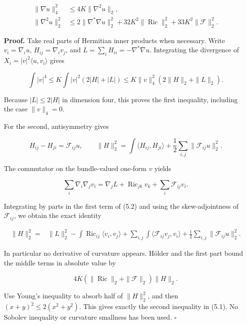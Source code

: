 \documentclass[
  11pt,
]{article}
\begin{document}
\[
 \begin{split}
 \|\nabla u\|_4^2&\le4K\|\nabla^2u\|_2,\\
 \|\nabla^2u\|_2^2
 &\le2\|\nabla^*\nabla u\|_2^2
       +32K^2\|\operatorname{Ric}\|_2^2
       +33K^2\|\mathscr F\|_2^2.
 \end{split}                                              \tag{5.1}
\]

\textbf{Proof.} Take real parts of Hermitian inner products when
necessary. Write \(v_i=\nabla_i u\), \(H_{ij}=\nabla_i v_j\), and
\(L=\sum_iH_{ii}=-\nabla^*\nabla u\). Integrating the divergence of
\(X_i=|v|^2\langle u,v_i\rangle\) gives

\[
 \int|v|^4
 \le K\int |v|^2(2|H|+|L|)
 \le K\|v\|_4^2(2\|H\|_2+\|L\|_2).
\]

Because \(|L|\le2|H|\) in dimension four, this proves the first
inequality, including the case \(\|v\|_4=0\).

For the second, antisymmetry gives

\[
 H_{ij}-H_{ji}=\mathscr F_{ij}u,\qquad
 \|H\|_2^2=\int\langle H_{ij},H_{ji}\rangle
                         +\frac12\sum_{i,j}\|\mathscr F_{ij}u\|_2^2.
 \tag{5.2}
\]

The commutator on the bundle-valued one-form \(v\) yields

\[
 \sum_i\nabla_i\nabla_jv_i
     =\nabla_jL+\operatorname{Ric}_{jk}v_k
                                      +\sum_i\mathscr F_{ij}v_i.
\]

Integrating by parts in the first term of (5.2) and using the
skew-adjointness of \(\mathscr F_{ij}\), we obtain the exact identity

\[
 \begin{split}
 \|H\|_2^2={}&\|L\|_2^2
  -\int\operatorname{Ric}_{ij}\langle v_i,v_j\rangle
  +\sum_{i,j}\int\langle\mathscr F_{ij}v_j,v_i\rangle
  +\frac12\sum_{i,j}\|\mathscr F_{ij}u\|_2^2.
 \end{split}                                              \tag{5.3}
\]

In particular no derivative of curvature appears. Hölder and the first
part bound the middle terms in absolute value by

\[
   4K(\|\operatorname{Ric}\|_2+\|\mathscr F\|_2)\|H\|_2.
\]

Use Young's inequality to absorb half of \(\|H\|_2^2\), and then
\((x+y)^2\le2(x^2+y^2)\). This gives exactly the second inequality in
(5.1). No Sobolev inequality or curvature smallness has been used.
\(\square\)
\end{document}
